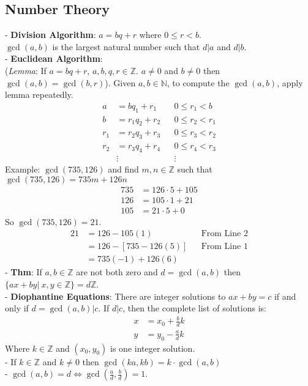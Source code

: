 \documentclass{article}
\begin{document}
\begin{multicols}{3}
  \subsection*{Number Theory}
  - \textbf{Division Algorithm}: $a = bq + r$ where $0 \leq r < b$.\\
  $\gcd(a,b)$ is the largest natural number such that $d|a$ and $d|b$.\\
  - \textbf{Euclidean Algorithm}:\\
  (\textit{Lemma}: If $a = bq + r$, $a,b,q,r \in \mathbb Z$. $a \not = 0$ and $b \not = 0$ then $\gcd(a,b) = \gcd(b,r)$).
  Given $a,b \in \mathbb N$, to compute the $\gcd(a,b)$, apply lemma repeatedly.
  \begin{align*}
    a &= bq_1 + r_1 && 0 \leq r_1 < b\\
    b &= r_1q_2 + r_2 && 0 \leq r_2 < r_1\\
    r_1 &= r_2q_3 + r_3 && 0 \leq r_3 < r_2\\
    r_2 &= r_3q_4 + r_4 && 0 \leq r_4 < r_3\\
    & \vdots && \vdots
  \end{align*}
  Example:
  $\gcd(735,126)$ and find $m,n \in \mathbb Z$ such that $\gcd(735,126) = 735m + 126n$
  \begin{align}
    735 &= 126 \cdot 5 + 105\\
    126 &= 105 \cdot 1 + 21\\
    105 &= 21 \cdot 5 + 0
  \end{align}
  So $\gcd(735,126) = 21$.\\
  \begin{align*}
    21 &= 126 - 105(1) && \text{From Line 2}\\
    &= 126 - [735 - 126(5)] && \text{From Line 1}\\
    &= 735(-1) + 126(6)
  \end{align*}
  - \textbf{Thm}: If $a,b \in \mathbb Z$ are not both zero and $d = \gcd(a,b)$ then 
  $\{ax + by|\ x,y \in \mathbb Z\} = d\mathbb Z$.\\
  - \textbf{Diophantine Equations}: There are integer solutions to $ax + by = c$ if and only if $d = \gcd(a,b) | c$. If $d|c$, then the complete list of solutions is:
  \begin{align*}
    x &= x_0 + \frac{b}{d}k\\
    y &= y_0 - \frac{a}{d}k
  \end{align*}
  Where $k \in \mathbb Z$ and $(x_0,y_0)$ is one integer solution.\\
  - If $k \in \mathbb Z$ and $k \not = 0$ then $\gcd(ka,kb) = k\cdot \gcd(a,b)$\\
  - $\gcd(a,b) = d \iff \gcd(\frac{a}{d},\frac{b}{d}) = 1$.



\end{multicols}
\end{document}
